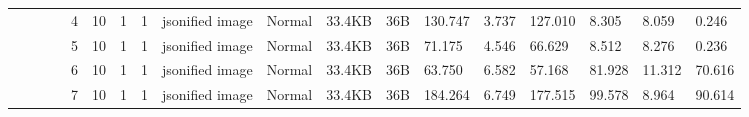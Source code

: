 \begin{landscape}
\begin{table}[]
{\begin{tabular}{@{}ccccllllllllllllll@{}}
                                                                                   &                              &                                &                                                                                                          & 4                                                     & 10                                       & 1                                          & 1                                 & jsonified image                  & Normal                             & 33.4KB                                        & 36B                                             & 130.747                 & 3.737    & 127.010                      & 8.305                   & 8.059    & 0.246                        \\
                                                                                   &                              &                                &                                                                                                          & 5                                                     & 10                                       & 1                                          & 1                                 & jsonified image                  & Normal                             & 33.4KB                                        & 36B                                             & 71.175                  & 4.546    & 66.629                       & 8.512                   & 8.276    & 0.236                        \\
                                                                                   &                              &                                &                                                                                                          & 6                                                     & 10                                       & 1                                          & 1                                 & jsonified image                  & Normal                             & 33.4KB                                        & 36B                                             & 63.750                  & 6.582    & 57.168                       & 81.928                  & 11.312   & 70.616                       \\
                                                                                   &                              &                                &                                                                                                          & 7                                                     & 10                                       & 1                                          & 1                                 & jsonified image                  & Normal                             & 33.4KB                                        & 36B                                             & 184.264                 & 6.749    & 177.515                      & 99.578                  & 8.964    & 90.614                       \\

\end{tabular}}
\end{table}
\end{landscape}

